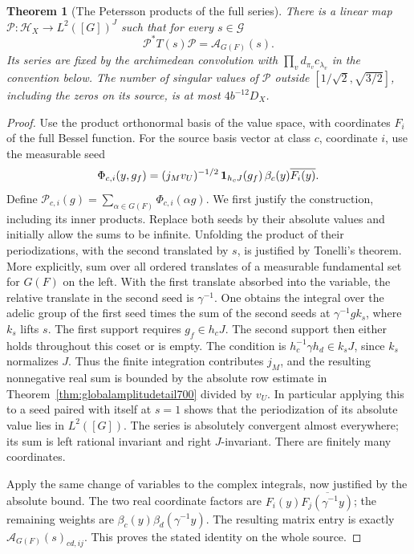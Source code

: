 \documentclass[a4paper,11pt]{article}
\newtheorem{theorem}[proposition]{Theorem}
\theoremstyle{definition}
\theoremstyle{remark}
\numberwithin{equation}{section}
\begin{document}
\begin{theorem}[The Petersson products of the full series]\leavevmode
\label{thm:poincaregram704}
There is a linear map \(\mathcal P:\mathcal H_X\to L^2([G])^J\)
such that for every \(s\in\mathcal G\)
\[
              \mathcal P^*T(s)\mathcal P=\mathcal A_{G(F)}(s).
\]
Its series are fixed by the archimedean convolution with
\(\prod_v d_{\pi_v}c_{\lambda_v}\) in the convention below.
The number of singular values of \(\mathcal P\) outside
\([1/\sqrt 2,\sqrt{3/2}]\), including the zeros on its source,
is at most \(4b^{-12}D_X\).
\end{theorem}
\begin{proof}
Use the product orthonormal basis of the value space, with
coordinates \(F_i\) of the full Bessel function. For the
source basis vector at class \(c\), coordinate \(i\), use the
measurable seed
\[
 \Phi_{c,i}(y,g_f)=(j_Mv_U)^{-1/2}\,
          {\bf1}_{h_cJ}(g_f)\,\beta_c(y)\overline{F_i(y)} .
\]
Define \(\mathcal P_{c,i}(g)=\sum_{\alpha\in G(F)}
\Phi_{c,i}(\alpha g)\). We first justify the construction,
including its inner products. Replace both seeds by their
absolute values and initially allow the sums to be infinite.
Unfolding the product of their periodizations, with the second
translated by \(s\), is justified by Tonelli's theorem. More
explicitly, sum over all ordered translates of a measurable
fundamental set for \(G(F)\) on the left. With the first
translate absorbed into the variable, the relative translate
in the second seed is \(\gamma^{-1}\). One obtains the integral
over the adelic group of the first seed times the sum of the
second seeds at \(\gamma^{-1}g k_s\), where \(k_s\) lifts \(s\).
The first support requires \(g_f\in h_cJ\). The second support
then either holds throughout this coset or is empty. The
condition is \(h_c^{-1}\gamma h_d\in k_sJ\), since \(k_s\)
normalizes \(J\). Thus the finite integration contributes
\(j_M\), and the resulting nonnegative real sum is bounded
by the absolute row estimate in
Theorem~\ref{thm:globalamplitudetail700} divided by \(v_U\).
In particular applying this to a seed paired with itself at
\(s=1\) shows that the periodization of its absolute value
lies in \(L^2([G])\). The series is absolutely convergent
almost everywhere; its sum is left rational invariant and
right \(J\)-invariant. There are finitely many coordinates.

Apply the same change of variables to the complex integrals,
now justified by the absolute bound. The two real coordinate
factors are \(F_i(y)\overline{F_j(\gamma^{-1}y)}\); the
remaining weights are \(\beta_c(y)\beta_d(\gamma^{-1}y)\).
The resulting matrix entry is exactly
\(\mathcal A_{G(F)}(s)_{cd,ij}\). This proves the stated
identity on the whole source.


\end{proof}
\end{document}

